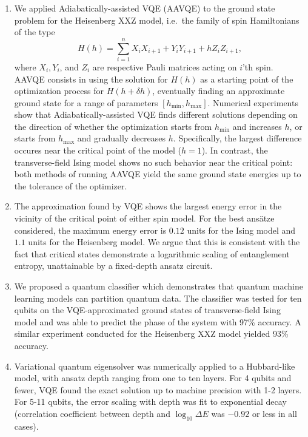 \begin{enumerate}

    \item We applied Adiabatically-assisted VQE (AAVQE) to the ground state problem for the Heisenberg XXZ model, i.e.~the family of spin Hamiltonians of the type 
    \begin{equation*}
        H(h) = \sum_{i=1}^{n} X_i X_{i+1} + Y_i Y_{i+1}+ h Z_i Z_{i+1},
    \end{equation*}
    where $X_i, Y_i$, and $Z_i$ are respective Pauli matrices acting on $i$'th spin. AAVQE consists in using the solution for $H(h)$ as a starting point of the optimization process for $H(h + \delta h)$, eventually finding an approximate ground state for a range of parameters $[h_{\mathrm{min}}, h_{\mathrm{max}}]$. Numerical experiments show that Adiabatically-assisted VQE finds different solutions depending on the direction of whether the optimization starts from $h_{\mathrm{min}}$ and increases $h$, or starts from $h_{\mathrm{max}}$ and gradually decreases $h$. Specifically, the largest difference occures near the critical point of the model ($h = 1$). In contrast, the transverse-field Ising model shows no such behavior near the critical point: both methods of running AAVQE yield the same ground state energies up to the tolerance of the optimizer.
    \item The approximation found by VQE shows the largest energy error in the vicinity of the critical point of either spin model. For the best ans\"atze considered, the maximum energy error is $0.12$ units for the Ising model and $1.1$ units for the Heisenberg model. We argue that this is consistent with the fact that critical states demonstrate a logarithmic scaling of entanglement entropy, 
    unattainable by a fixed-depth ansatz circuit.
    \item We proposed a quantum classifier which demonstrates that quantum machine learning models can partition quantum data. The classifier was tested for ten qubits on the VQE-approximated ground states of transverse-field Ising model and was able to predict the phase of the system with 97\% accuracy. A similar experiment conducted for the Heisenberg XXZ model yielded 93\% accuracy.

    \item Variational quantum eigensolver was numerically applied to a Hubbard-like model, with ansatz depth ranging from one to ten layers. For 4 qubits and fewer, VQE found the exact solution up to machine precision with 1-2 layers. For 5-11 qubits, the error scaling with depth was fit to exponential decay (correlation coefficient between depth and $\log_{10} \Delta E$ was $-0.92$ or less in all cases).
    

\end{enumerate}
